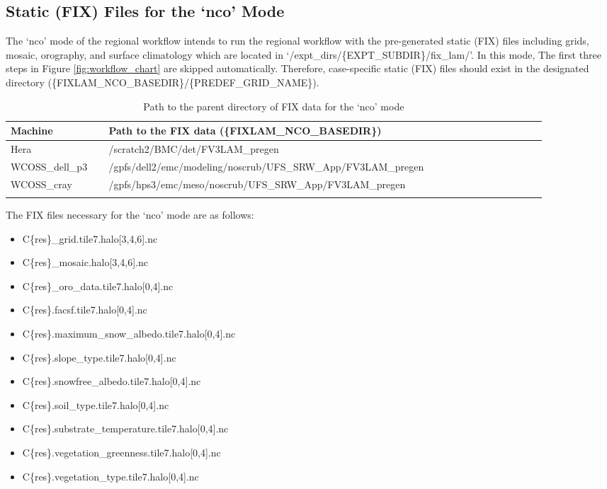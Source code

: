 \documentclass[11pt,fleqn]{report}              %
\begin{document}
\subsection{Static (FIX) Files for the `nco' Mode}
\label{subsec:wflow_fix_nco}

The `nco' mode of the regional workflow intends to run the regional workflow with the pre-generated static (FIX) files including grids, mosaic, orography, and surface climatology which are located in `/expt\_dirs/\{EXPT\_SUBDIR\}/fix\_lam/'. In this mode, The first three steps in Figure \ref{fig:workflow_chart} are skipped automatically. Therefore, case-specific static (FIX) files should exist in the designated directory (\{FIXLAM\_NCO\_BASEDIR\}/\{PREDEF\_GRID\_NAME\}).

{
\fontsize{10}{12}\selectfont
\begin{longtable}{ p{0.16\linewidth} | p{0.72\linewidth} }
\hline
\hline
 Machine & Path to the FIX data (\{FIXLAM\_NCO\_BASEDIR\}) \\
\hline
 Hera & /scratch2/BMC/det/FV3LAM\_pregen \\
 WCOSS\_dell\_p3 & /gpfs/dell2/emc/modeling/noscrub/UFS\_SRW\_App/FV3LAM\_pregen \\
 WCOSS\_cray & /gpfs/hps3/emc/meso/noscrub/UFS\_SRW\_App/FV3LAM\_pregen \\
\hline
\caption{Path to the parent directory of FIX data for the `nco' mode}
\label{table:path_nco_fixlam}
\end{longtable}
}

The FIX files necessary for the `nco' mode are as follows:
\begin{itemize}
\item C\{res\}\_grid.tile7.halo[3,4,6].nc
\item C\{res\}\_mosaic.halo[3,4,6].nc
\item C\{res\}\_oro\_data.tile7.halo[0,4].nc
\item C\{res\}.facsf.tile7.halo[0,4].nc
\item C\{res\}.maximum\_snow\_albedo.tile7.halo[0,4].nc
\item C\{res\}.slope\_type.tile7.halo[0,4].nc
\item C\{res\}.snowfree\_albedo.tile7.halo[0,4].nc
\item C\{res\}.soil\_type.tile7.halo[0,4].nc
\item C\{res\}.substrate\_temperature.tile7.halo[0,4].nc
\item C\{res\}.vegetation\_greenness.tile7.halo[0,4].nc
\item C\{res\}.vegetation\_type.tile7.halo[0,4].nc
\end{itemize}
\end{document}
